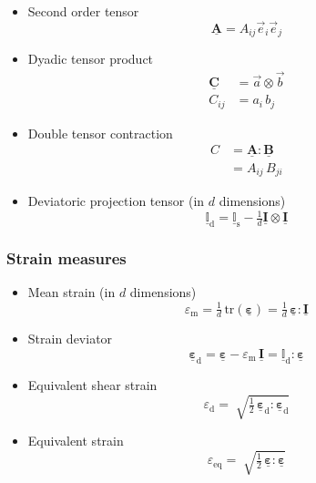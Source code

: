 \documentclass[times,namecite]{goose-article}
\newcommand\T[1]{\underline{\bm{{#1}}}}
\newcommand\TT[1]{\underline{\mathbb{{#1}}}}
\begin{document}
\begin{itemize}
%
\item Second order tensor
\begin{equation}
  \T{A} = A_{ij} \vec{e}_i \vec{e}_j
\end{equation}
%
\item Dyadic tensor product
\begin{align}
  \T{C} &= \vec{a} \otimes \vec{b} \\
  C_{ij} &= a_{i} \, b_{j}
\end{align}
%
\item Double tensor contraction
\begin{align}
  C &= \T{A} : \T{B} \\
    &= A_{ij} \, B_{ji}
\end{align}
%
\item Deviatoric projection tensor (in $d$ dimensions)
\begin{equation}
  \TT{I}_\mathrm{d}
  = \TT{I}_\mathrm{s} - \tfrac{1}{d} \T{I} \otimes \T{I}
\end{equation}
%
\end{itemize}

\subsubsection{Strain measures}
\label{sec:nomenclature::strain}

\begin{itemize}
%
\item Mean strain (in $d$ dimensions)
\begin{equation}
  \varepsilon_\mathrm{m}
  = \tfrac{1}{d} \, \mathrm{tr} ( \T{\varepsilon} )
  = \tfrac{1}{d} \, \T{\varepsilon} : \T{I}
\end{equation}
%
\item Strain deviator
\begin{equation}
  \T{\varepsilon}_\mathrm{d}
  = \T{\varepsilon} - \varepsilon_\mathrm{m} \, \T{I}
  = \TT{I}_\mathrm{d} : \T{\varepsilon}
\end{equation}
%
\item Equivalent shear strain
\begin{equation}
  \varepsilon_\mathrm{d}
  = \; \sqrt{
    \tfrac{1}{2} \, \T{\varepsilon}_\mathrm{d} : \T{\varepsilon}_\mathrm{d}
  }
\end{equation}
%
\item Equivalent strain
\begin{equation}
  \varepsilon_\mathrm{eq}
  = \; \sqrt{
    \tfrac{1}{2} \, \T{\varepsilon} : \T{\varepsilon}
  }
\end{equation}
%
\end{itemize}
\end{document}
